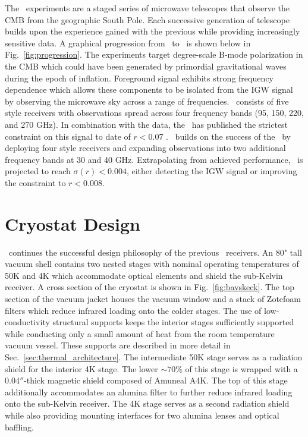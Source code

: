 \documentclass[]{spie}  %
\begin{document}
The \bk\ experiments are a staged series of microwave telescopes that observe
the CMB from the geographic South Pole. Each successive generation of
telescope builds upon the experience gained with the previous while providing
increasingly sensitive data. A graphical progression from \ to
\biceparray\ is shown below in Fig.~\ref{fig:progression}. The experiments target degree-scale B-mode
polarization in the CMB which could have been generated by primordial
gravitational waves during the epoch of inflation. Foreground signal exhibits strong frequency dependence which allows these components to be isolated from the IGW
signal by observing the microwave sky across a range of frequencies.
\keckarray\ consists of five  style receivers with observations spread
across four frequency bands (95, 150, 220, and 270 GHz). In combination with the  data, the \keckarray\ has
published the strictest constraint on this signal to date of $r<0.07$
\cite{bk14}. \biceparray\ builds on the success of the \keckarray\ by
deploying four  style receivers and expanding observations into two
additional frequency bands at 30 and 40 GHz. Extrapolating from achieved performance,
\biceparray\ is projected to reach $\sigma(r)<0.004$, either detecting the IGW
signal or improving the constraint to $r<0.008$. 



	
\section{Cryostat Design}

\biceparray\ continues the successful design philosophy of
the previous \bk\ receivers. An 80" tall vacuum shell contains two nested
stages with nominal operating temperatures of 50K and 4K which accommodate
optical elements and shield the sub-Kelvin receiver. A cross section of
the cryostat is shown in Fig.~\ref{fig:bavskeck}. The top section of the
vacuum jacket houses the vacuum window and a stack of Zotefoam filters which reduce infrared loading
onto the colder stages. The use of low-conductivity structural supports keeps
the interior stages sufficiently supported while conducting only a small
amount of heat from the room temperature vacuum vessel. These supports are
described in more detail in Sec.~\ref{sec:thermal_architecture}. The
intermediate 50K stage serves as a radiation shield for the interior 4K stage.
The lower $\sim70\%$ of this stage is wrapped with a $0.04''$-thick magnetic
shield composed of Amuneal A4K. The top of this stage additionally
accommodates an alumina filter to further reduce infrared loading onto the
sub-Kelvin receiver. The 4K stage serves as a second radiation shield while
also providing mounting interfaces for two alumina lenses and optical
baffling.
\end{document}
